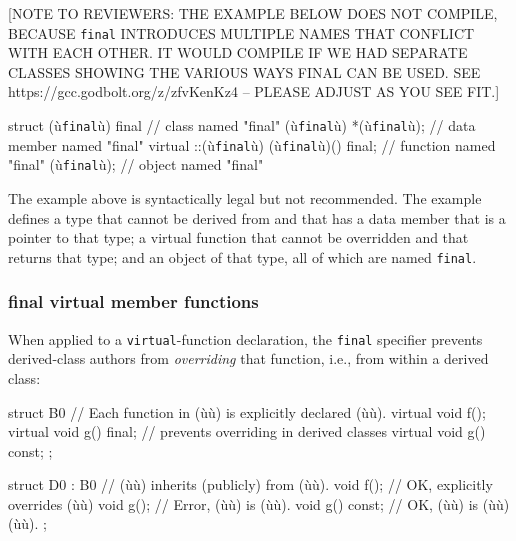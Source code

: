 %

[NOTE TO REVIEWERS: THE EXAMPLE BELOW DOES NOT COMPILE, BECAUSE \texttt{final}
INTRODUCES MULTIPLE NAMES THAT CONFLICT WITH EACH OTHER. IT WOULD
COMPILE IF WE HAD SEPARATE CLASSES SHOWING THE VARIOUS WAYS FINAL CAN BE
USED. SEE https://gcc.godbolt.org/z/zfvKenKz4 -- PLEASE ADJUST AS YOU
SEE FIT.]


\begin{emcppslisting}
struct (ù{\texttt{final}}ù) final                  // class named "final"
{
    (ù{\texttt{final}}ù) *(ù{\texttt{final}}ù);                   // data member named "final"
    virtual ::(ù{\texttt{final}}ù) (ù{\texttt{final}}ù)() final;  // function named "final"
} (ù{\texttt{final}}ù);                            // object named "final"
\end{emcppslisting}
    

\noindent The example above is syntactically legal but not recommended. The
example defines a type that cannot be derived from and that has a data
member that is a pointer to that type; a virtual function that cannot be
overridden and that returns that type; and an object of that type, all
of which are named \lstinline!final!.

\subsubsection[\lstinline!final! virtual member functions]{{\SubsubsecCode final} virtual member functions}\label{final-virtual-member-functions}

When applied to a \lstinline!virtual!-function declaration, the
\lstinline!final! specifier prevents derived-class authors from
\emph{overriding} that function, i.e., from within a derived class:

\begin{emcppslisting}
struct B0  // Each function in (ù{}ù) is explicitly declared (ù{}ù).
{
    virtual void f();
    virtual void g() final;  // prevents overriding in derived classes
    virtual void g() const;
};

struct D0 : B0       // (ù{}ù) inherits (publicly) from (ù{}ù).
{
    void f();        // OK, explicitly overrides (ù{}ù)
    void g();        // Error, (ù{}ù) is (ù{}ù).
    void g() const;  // OK, (ù{}ù) is (ù{}ù) (ù{}ù).
};
\end{emcppslisting}
    


